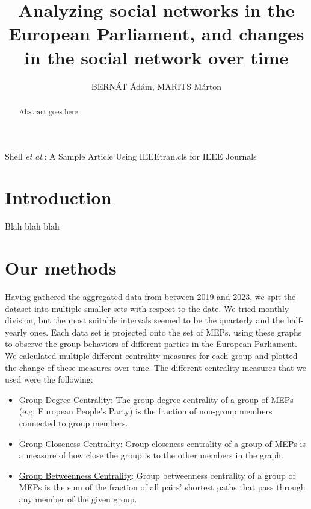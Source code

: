 \documentclass[lettersize,journal]{IEEEtran}
\begin{document}
\title{Analyzing social networks in the European Parliament, and changes in the social network over time}

\author{{BERNÁT Ádám, MARITS Márton}
}

%
{Shell \MakeLowercase{\textit{et al.}}: A Sample Article Using IEEEtran.cls for IEEE Journals}


\maketitle

\begin{abstract}
	Abstract goes here
\end{abstract}

\section{Introduction}

Blah blah blah

\section{Our methods} \label{sec:method}

Having gathered the aggregated data from between 2019 and 2023, we spit the dataset into multiple smaller sets with respect to the date. We tried monthly division, but the most suitable intervals seemed to be the quarterly and the half-yearly ones. Each data set is projected onto the set of  MEPs, using these graphs to observe the group behaviors of different parties in the European Parliament. We calculated multiple different centrality measures for each group and plotted the change of these measures over time. The different centrality measures that we used were the following:

\begin{itemize}
\item \underline{Group Degree Centrality}: The group degree centrality of a group of MEPs (e.g: European People's Party) is the fraction of non-group members connected to group members.
\item \underline{Group Closeness Centrality}: Group closeness centrality of a group of MEPs is a measure of how close the group is to the other members in the graph.
\item \underline{Group Betweenness Centrality}: Group betweenness centrality of a group of MEPs is the sum of the fraction of all pairs' shortest paths that pass through any member of the given group.
\end{itemize}
\end{document}
